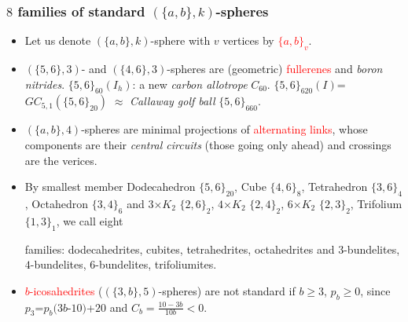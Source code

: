 \documentclass{beamer}
\begin{document}
\begin{frame}\frametitle{$8$ families of standard $(\{a,b\},k)$-spheres}
\vspace{-3mm}
 \begin{itemize}

\item Let us denote $(\{a,b\},k)$-sphere with $v$ vertices by
\textcolor{red}{$\{a,b\}_v$}.




\item $(\{5,6\},3)$- and $(\{4,6\},3)$-spheres are  
(geometric) \textcolor{red}{fullerenes} and {\em boron nitrides}. 
$\{5,6\}_{60}(I_h)$: a new  {\em carbon allotrope} $C_{60}$.
$\{5,6\}_{620}(I)$=$GC_{5,1}(\{5,6\}_{20})$ $\approx$ {\em Callaway golf 
ball} $\{5,6\}_{660}$.

\item $(\{a,b\},4)$-spheres are minimal projections of  
\textcolor{red}{alternating 
links}, 
whose
components are their  {\em central circuits} 
 (those going only ahead) and crossings are the verices.


\item By smallest member Dodecahedron $\{5,6\}_{20}$, Cube 
$\{4,6\}_8$, 
Tetrahedron $\{3,6\}_4$,   Octahedron 
$\{3,4\}_6$ and   $3$$\times $$K_2$ $\{2,6\}_2$, $4$$\times$$K_2$ 
$\{2,4\}_2$, 
$6$$\times $$K_2$ $\{2,3\}_2$,
 Trifolium  $\{1,3\}_1$, we call 
eight

families: dodecahedrites, 
cubites,  tetrahedrites, octahedrites and 
$3$-bundelites, $4$-bundelites,  
$6$-bundelites, trifoliumites. 
\item \textcolor{red}{$b$-icosahedrites} ($(\{3,b\},5)$-spheres)
are not 
standard if $b$$\ge$$3$, $p_b$$\ge$$0$, since $p_3$=$p_b(3b$-$10)$+$20$ and 
$C_b=\frac{10-3b}{10b}<0$.
\end{itemize}
\end{frame}
\end{document}
